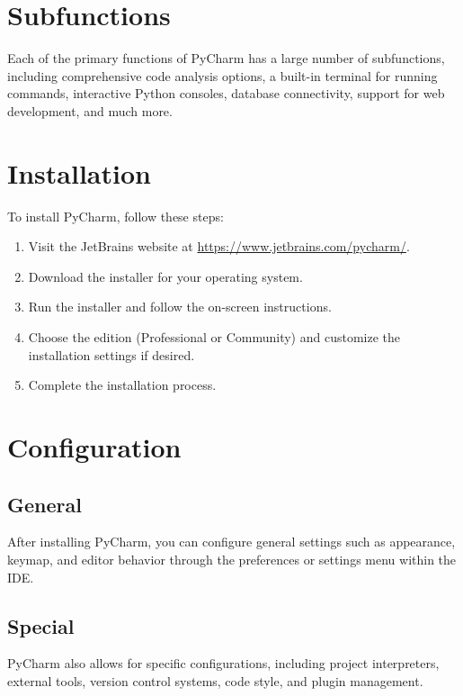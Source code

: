 \section{Subfunctions}

Each of the primary functions of PyCharm has a large number of subfunctions, including comprehensive code analysis options, a built-in terminal for running commands, interactive Python consoles, database connectivity, support for web development, and much more.

\section{Installation}
To install PyCharm, follow these steps:
\begin{enumerate}
	\item Visit the JetBrains website at \url{https://www.jetbrains.com/pycharm/}.
	\item Download the installer for your operating system.
	\item Run the installer and follow the on-screen instructions.
	\item Choose the edition (Professional or Community) and customize the installation settings if desired.
	\item Complete the installation process.
\end{enumerate}

\section{Configuration}
\subsection{General}
After installing PyCharm, you can configure general settings such as appearance, keymap, and editor behavior through the preferences or settings menu within the IDE.

\subsection{Special}
PyCharm also allows for specific configurations, including project interpreters, external tools, version control systems, code style, and plugin management.

